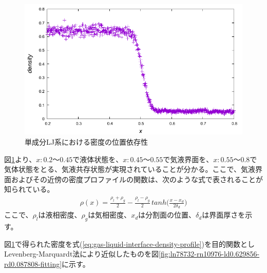 \documentclass[titlepage]{jsreport}
\begin{document}
\begin{figure}[htbp]
    \begin{center}
        \includegraphics[width=14cm]{fig/ln78732-rn10976-ld0.629856-rd0.087808/ln78732-rn10976-ld0.629856-rd0.087808.pdf}
    \end{center}
    \caption{単成分LJ系における密度の位置依存性}
    \label{fig:ln78732-rn10976-ld0.629856-rd0.087808}
\end{figure}

図\ref{fig:ln78732-rn10976-ld0.629856-rd0.087808}より、$x:0.2〜0.45$で液体状態を、$x:0.45〜0.55$で気液界面を、$x:0.55〜0.8$で気体状態をとる、気液共存状態が実現されていることが分かる。ここで、気液界面およびその近傍の密度プロファイルの関数は、次のような式で表されることが知られている\cite{gas-liquid-interface-density-profile}。
\large
\begin{eqnarray}
    \rho(x) = \frac{\rho_l+\rho_g}{2} - \frac{\rho_l-\rho_g}{2}\,tanh\Bigg(\frac{x-x_d}{2\delta_d}\Bigg) \label{eq:gas-liquid-interface-density-profile}
\end{eqnarray}
\normalsize
ここで、$\rho_l$は液相密度、$\rho_g$は気相密度、$x_d$は分割面の位置、$\delta_d$は界面厚さを示す。

図\ref{fig:ln78732-rn10976-ld0.629856-rd0.087808}で得られた密度を式(\ref{eq:gas-liquid-interface-density-profile})を目的関数としLevenberg-Marquardt法により近似したものを図\ref{fig:ln78732-rn10976-ld0.629856-rd0.087808-fitting}に示す。
\end{document}
